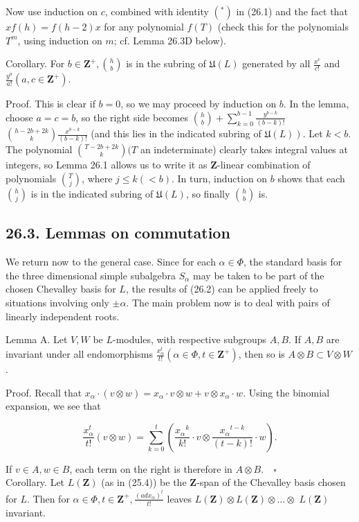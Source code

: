 \documentclass[10pt]{article}
\begin{document}
Now use induction on $c$, combined with identity $\left({ }^{*}\right)$ in (26.1) and the fact that $x f(h)=f(h-2) x$ for any polynomial $f(T)$ (check this for the polynomials $T^{m}$, using induction on $m$; cf. Lemma 26.3D below).

Corollary. For $b \in \mathbf{Z}^{+},\binom{h}{b}$ is in the subring of $\mathfrak{U}(L)$ generated by all $\frac{x^{c}}{c!}$ and $\frac{y^{a}}{a!}\left(a, c \in \mathbf{Z}^{+}\right)$.

Proof. This is clear if $b=0$, so we may proceed by induction on $b$. In the lemma, choose $a=c=b$, so the right side becomes $\binom{h}{b}+\sum_{k=0}^{b-1} \frac{y^{b-k}}{(b-k)!}$ $\binom{h-2 b+2 k}{k} \frac{x^{b-k}}{(b-k)!}$ (and this lies in the indicated subring of $\left.\mathfrak{U}(L)\right)$. Let $k<b$. The polynomial $\binom{T-2 b+2 k}{k}(T$ an indeterminate) clearly takes integral values at integers, so Lemma 26.1 allows us to write it as $\mathbf{Z}$-linear combination of polynomials $\binom{T}{j}$, where $j \leq k(<b)$. In turn, induction on $b$ shows that each $\binom{h}{j}$ is in the indicated subring of $\mathfrak{U}(L)$, so finally $\binom{h}{b}$ is.

\subsection*{26.3. Lemmas on commutation}
We return now to the general case. Since for each $\alpha \in \Phi$, the standard basis for the three dimensional simple subalgebra $S_{\alpha}$ may be taken to be part of the chosen Chevalley basis for $L$, the results of (26.2) can be applied freely to situations involving only $\pm \alpha$. The main problem now is to deal with pairs of linearly independent roots.

Lemma A. Let $V, W$ be $L$-modules, with respective subgroups $A, B$. If $A, B$ are invariant under all endomorphisms $\frac{x_{\alpha}^{t}}{t!}\left(\alpha \in \Phi, t \in \mathbf{Z}^{+}\right)$, then so is $A \otimes B \subset V \otimes W$.

Proof. Recall that $x_{\alpha} \cdot(v \otimes w)=x_{\alpha} \cdot v \otimes w+v \otimes x_{\alpha} \cdot w$. Using the binomial expansion, we see that

$$
\frac{x_{\alpha}^{t}}{t!}(v \otimes w)=\sum_{k=0}^{t}\left(\frac{x_{\alpha}{ }^{k}}{k!} \cdot v \otimes \frac{x_{\alpha}{ }^{t-k}}{(t-k)!} \cdot w\right) .
$$

If $v \in A, w \in B$, each term on the right is therefore in $A \otimes B . \quad \square$\\
Corollary. Let $L(\mathbf{Z})$ (as in (25.4)) be the $\mathbf{Z}$-span of the Chevalley basis chosen for $L$. Then for $\alpha \in \Phi, t \in \mathbf{Z}^{+}, \frac{\left(a d x_{\alpha}\right)^{t}}{t!}$ leaves $L(\mathbf{Z}) \otimes L(\mathbf{Z}) \otimes \ldots \otimes$ $L(\mathbf{Z})$ invariant.
\end{document}
